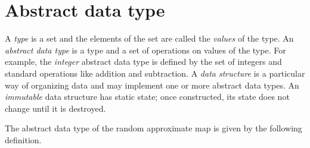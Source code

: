 \documentclass[ ../main.tex]{subfiles}
\begin{document}
\section{Abstract data type}
A \emph{type} is a set and the elements of the set are called the \emph{values} of the type. An \emph{abstract data type} is a type and a set of operations on values of the type. For example, the \emph{integer} abstract data type is defined by the set of integers and standard operations like addition and subtraction. A \emph{data structure} is a particular way of organizing data and may implement one or more abstract data types. An \emph{immutable} data structure has static state; once constructed, its state does not change until it is destroyed.

The abstract data type of the random approximate map is given by the following definition.
\end{document}
